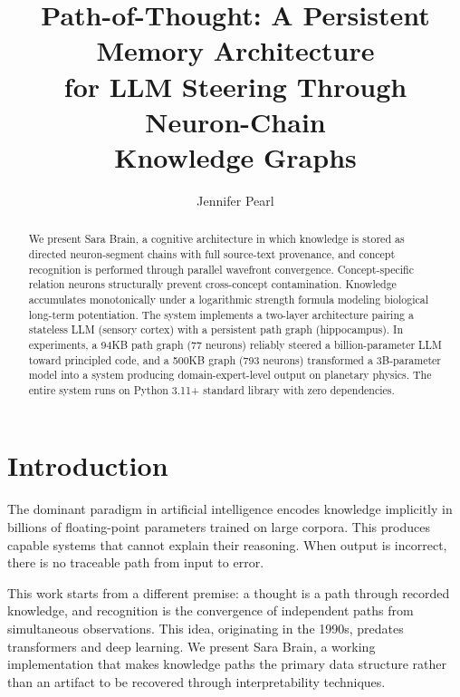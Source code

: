 \documentclass[runningheads]{llncs}
\begin{document}
\title{Path-of-Thought: A Persistent Memory Architecture\\for LLM Steering Through Neuron-Chain\\Knowledge Graphs}

\author{Jennifer Pearl}



\maketitle

\begin{abstract}
We present Sara Brain, a cognitive architecture in which knowledge is stored as directed neuron-segment chains with full source-text provenance, and concept recognition is performed through parallel wavefront convergence. Concept-specific relation neurons structurally prevent cross-concept contamination. Knowledge accumulates monotonically under a logarithmic strength formula modeling biological long-term potentiation. The system implements a two-layer architecture pairing a stateless LLM (sensory cortex) with a persistent path graph (hippocampus). In experiments, a 94KB path graph (77 neurons) reliably steered a billion-parameter LLM toward principled code, and a 500KB graph (793 neurons) transformed a 3B-parameter model into a system producing domain-expert-level output on planetary physics. The entire system runs on Python 3.11+ standard library with zero dependencies.

\end{abstract}

\section{Introduction}

The dominant paradigm in artificial intelligence encodes knowledge implicitly in billions of floating-point parameters trained on large corpora. This produces capable systems that cannot explain their reasoning. When output is incorrect, there is no traceable path from input to error.

This work starts from a different premise: a thought is a path through recorded knowledge, and recognition is the convergence of independent paths from simultaneous observations. This idea, originating in the 1990s, predates transformers and deep learning. We present Sara Brain, a working implementation that makes knowledge paths the primary data structure rather than an artifact to be recovered through interpretability techniques.
\end{document}
